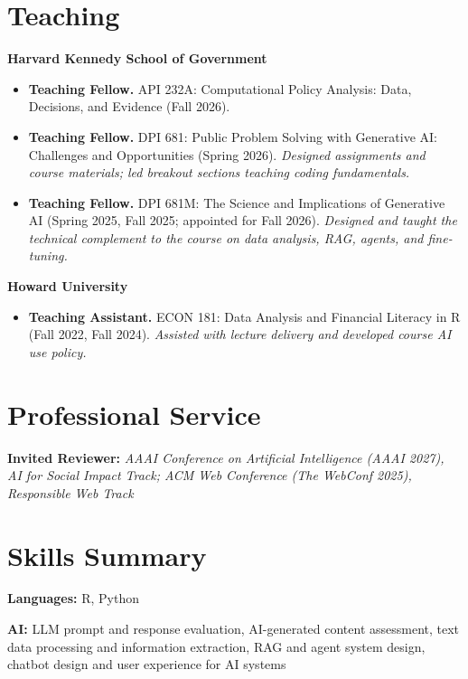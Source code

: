 \documentclass[11pt]{article}
\newcommand{\entrysep}{\vspace{4pt}}
\begin{document}
\section*{Teaching}

\textbf{Harvard Kennedy School of Government}
\begin{itemize}[leftmargin=2.2em, topsep=3pt, itemsep=4pt]
  \item \textbf{Teaching Fellow.} API 232A: Computational Policy Analysis:
  Data, Decisions, and Evidence (Fall 2026).
  \item \textbf{Teaching Fellow.} DPI 681: Public Problem Solving with Generative AI:
  Challenges and Opportunities (Spring 2026). \textit{Designed assignments and course materials;
  led breakout sections teaching coding fundamentals.}
  \item \textbf{Teaching Fellow.} DPI 681M: The Science and Implications of Generative AI
  (Spring 2025, Fall 2025; appointed for Fall 2026). \textit{Designed and taught the technical
  complement to the course on data analysis, RAG, agents, and fine-tuning.}
\end{itemize}

\entrysep

\textbf{Howard University}
\begin{itemize}[leftmargin=2.2em, topsep=3pt, itemsep=4pt]
  \item \textbf{Teaching Assistant.} ECON 181: Data Analysis and Financial Literacy in R
  (Fall 2022, Fall 2024). \textit{Assisted with lecture delivery and developed course AI use policy.}
\end{itemize}

\section*{Professional Service}

\textbf{Invited Reviewer:} \textit{AAAI Conference on Artificial Intelligence (AAAI 2027),
AI for Social Impact Track; ACM Web Conference (The WebConf 2025), Responsible Web Track}

\section*{Skills Summary}

\textbf{Languages:} R, Python

\medskip

\textbf{AI:} LLM prompt and response evaluation, AI-generated content assessment, text data processing and information extraction, RAG and agent system design, chatbot design and user experience for AI systems
\end{document}
